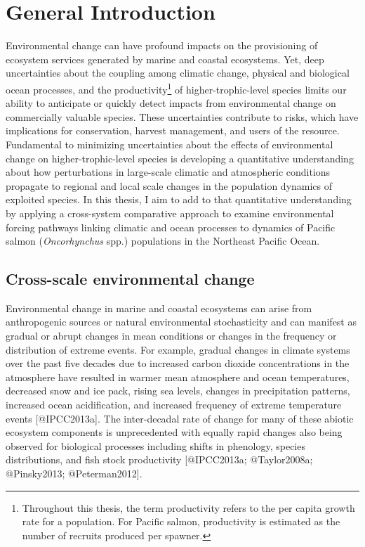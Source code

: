 \chapter{General Introduction}\label{general-introduction}

Environmental change can have profound impacts on the provisioning of
ecosystem services generated by marine and coastal ecosystems. Yet, deep
uncertainties about the coupling among climatic change, physical and
biological ocean processes, and the productivity\footnote{Throughout
  this thesis, the term productivity refers to the per capita growth
  rate for a population. For Pacific salmon, productivity is estimated
  as the number of recruits produced per spawner.} of
higher-trophic-level species limits our ability to anticipate or quickly
detect impacts from environmental change on commercially valuable
species. These uncertainties contribute to risks, which have
implications for conservation, harvest management, and users of the
resource. Fundamental to minimizing uncertainties about the effects of
environmental change on higher-trophic-level species is developing a
quantitative understanding about how perturbations in large-scale
climatic and atmospheric conditions propagate to regional and local
scale changes in the population dynamics of exploited species. In this
thesis, I aim to add to that quantitative understanding by applying a
cross-system comparative approach to examine environmental forcing
pathways linking climatic and ocean processes to dynamics of Pacific
salmon (\emph{Oncorhynchus} spp.) populations in the Northeast Pacific
Ocean.

\section{Cross-scale environmental
change}\label{cross-scale-environmental-change}

Environmental change in marine and coastal ecosystems can arise from
anthropogenic sources or natural environmental stochasticity and can
manifest as gradual or abrupt changes in mean conditions or changes in
the frequency or distribution of extreme events. For example, gradual
changes in climate systems over the past five decades due to increased
carbon dioxide concentrations in the atmosphere have resulted in warmer
mean atmosphere and ocean temperatures, decreased snow and ice pack,
rising sea levels, changes in precipitation patterns, increased ocean
acidification, and increased frequency of extreme temperature events
{[}@IPCC2013a{]}. The inter-decadal rate of change for many of these
abiotic ecosystem components is unprecedented with equally rapid changes
also being observed for biological processes including shifts in
phenology, species distributions, and fish stock productivity
{[}@IPCC2013a; @Taylor2008a; @Pinsky2013; @Peterman2012{]}.

